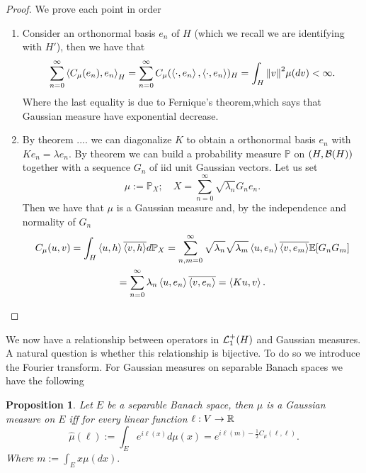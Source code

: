 \documentclass[12pt]{article}
\newtheorem{proposition}{Proposition}
\newcommand{\br}[1]{\left\langle#1\right\rangle}
\begin{document}
\begin{proof} We prove each point in order

	\begin{enumerate}        \item Consider an orthonormal basis $e_n$ of $H$ (which we recall we are identifying with $H'$), then we have that
		      \begin{equation*}
			      \sum_{n=0}^{\infty} \br{C_\mu (e_n),e_n}_H=\sum_{n=0}^{\infty} C_\mu (\br{\cdot ,e_n},\br{\cdot ,e_n})_H=\int_{H}\norm{v}^2 \mu (dv)<\infty.
		      \end{equation*}
		      Where the last equality is due to Fernique's theorem,which says that Gaussian measure have exponential decrease.
		\item By theorem .... we can diagonalize $K$ to obtain a orthonormal basis  $e_n$ with  $Ke_n=\lambda e_n$. By theorem we can build a probability measure $\mathbb{P}$ on $(H,\mathcal{B}(H))$ together with a sequence $G_n$ of iid unit Gaussian vectors. Let us set
		      \begin{equation*}
			      \mu :=\mathbb{P}_X;\quad X=\sum_{n=0}^{\infty} \sqrt{\lambda _n} G_ne_n .
		      \end{equation*}
		      Then we have that $\mu $ is a Gaussian measure and, by the  independence and normality of $G_n$
		      \begin{multline*}
			      C_\mu (u,v)=\int_{H}\br{u,h}\overline{\br{v,h}} d\mathbb{P}_X=\sum_{n,m=0}^{\infty}\sqrt{\lambda_n}\sqrt{\lambda_m}  \br{u,e_n}\overline{\br{v,e_m}}\E[G_nG_m]\\
			      =\sum_{n=0}^{\infty}\lambda_n\br{u,e_n}\overline{\br{v,e_n}}=\br{Ku,v}.
		      \end{multline*}

	\end{enumerate}
\end{proof}
We now have a relationship between operators in $\mathcal{L}_1^+(H)$ and Gaussian measures. A natural question is whether this relationship is bijective. To do so we introduce the Fourier transform. For Gaussian measures on separable Banach spaces we have the following
\begin{proposition}
	Let $E$ be a separable Banach space, then $\mu $ is a Gaussian measure on $E$ iff for every linear function  $\ell :V\to{\mathbb R}$
	\begin{equation*}
		\hat{\mu }(\ell ):=\int_{E} e^{i\ell (x)}d\mu(x)=e^{i\ell(m)-\frac{1}{2}C_\mu (\ell ,\ell )}.
	\end{equation*}
	Where
	$        m:=\int_{E}x \mu (dx).
	$
\end{proposition}
\end{document}
